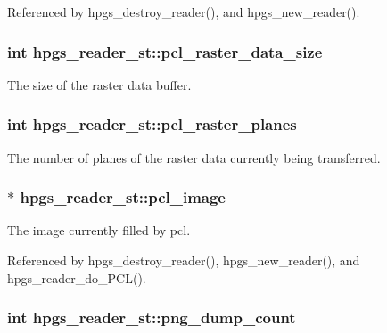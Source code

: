 Referenced by hpgs\_\-destroy\_\-reader(), and hpgs\_\-new\_\-reader().
\subsubsection[pcl\_\-raster\_\-data\_\-size]{\setlength{\rightskip}{0pt plus 5cm}int {\bf hpgs\_\-reader\_\-st::pcl\_\-raster\_\-data\_\-size}}\label{structhpgs__reader__st_6d466db42e933a5951a9f1eb32d7cb02}


The size of the raster data buffer. 
\subsubsection[pcl\_\-raster\_\-planes]{\setlength{\rightskip}{0pt plus 5cm}int {\bf hpgs\_\-reader\_\-st::pcl\_\-raster\_\-planes}}\label{structhpgs__reader__st_2be566b130835713d4ece66cc8634900}


The number of planes of the raster data currently being transferred. 
\subsubsection[pcl\_\-image]{$\ast$ {\bf hpgs\_\-reader\_\-st::pcl\_\-image}}\label{structhpgs__reader__st_e63839dcbee1b611dc6395e0ad1dbb3e}


The image currently filled by pcl. 

Referenced by hpgs\_\-destroy\_\-reader(), hpgs\_\-new\_\-reader(), and hpgs\_\-reader\_\-do\_\-PCL().
\subsubsection[png\_\-dump\_\-count]{\setlength{\rightskip}{0pt plus 5cm}int {\bf hpgs\_\-reader\_\-st::png\_\-dump\_\-count}}\label{structhpgs__reader__st_3943aa511e5cc534061bec0511dd2003}



